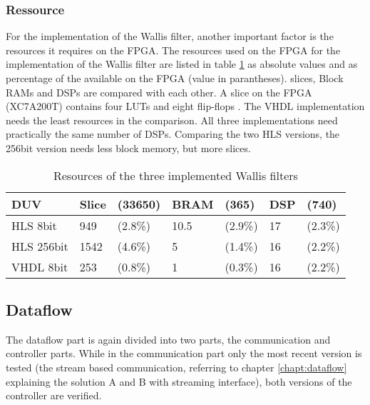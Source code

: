 \subsubsection*{Ressource} \label{ch:ver:ip:ressource}
For the implementation of the Wallis filter, another important factor is the
resources it requires on the FPGA. The resources used on the FPGA for the
implementation of the Wallis filter are listed in table \ref{tab:ressource} as
absolute values and as percentage of the available on the FPGA (value in
parantheses).
\glspl{slice}, Block RAMs and DSPs are compared with each other. A slice on the FPGA 
(XC7A200T) contains four LUTs and eight flip-flops \cite{ds180}.
The VHDL implementation needs the least resources in the comparison. All
three implementations need practically the same number of DSPs. Comparing
the two HLS versions, the 256bit version needs less block memory, but more
slices.

\begin{table}[tb!]
    \centering
    \begin{tabular}{l l l l l l l}
        \toprule
        DUV         & Slice & (33650) & BRAM & (365) & DSP & (740) \\
        \midrule
        HLS  8bit    & 949 & (2.8\%)   & 10.5 & (2.9\%)  & 17 & (2.3\%) \\
        HLS  256bit  & 1542 & (4.6\%)  & 5 & (1.4\%)     & 16 & (2.2\%) \\
        VHDL 8bit       & 253 & (0.8\%)   & 1 & (0.3\%)     & 16 & (2.2\%) \\
        \bottomrule
    \end{tabular}
    \caption{Resources of the three implemented Wallis filters}
    \label{tab:ressource}
\end{table}


%
%
\subsection{Dataflow}\label{ch:verification:dataflow}
The dataflow part is again divided into two parts, the communication and
controller parts. While in the communication part only the most recent version
is tested (the stream based communication, referring to chapter 
\ref{chapt:dataflow} explaining the solution
A and B with streaming interface), both versions of the controller are verified.

